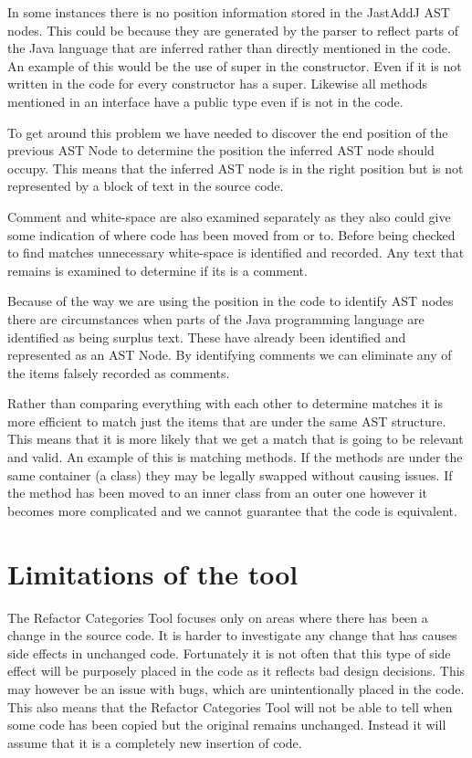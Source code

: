 In some instances there is no position information stored in the JastAddJ AST nodes.  This could be because they are generated by the parser to reflect parts of the Java language that are inferred rather than directly mentioned in the code.  An example of this would be the use of super in the constructor.  Even if it is not written in the code for every constructor has a super. Likewise all methods mentioned in an interface have a public type even if is not in the code.

To get around this problem we have needed to discover the end position of the previous AST Node to determine the position the inferred AST node should occupy.  This means that the inferred AST node is in the right position but is not represented by a block of text in the source code. 

Comment and white-space are also examined separately as they also could give some indication of where code has been moved from or to.
Before being checked to find matches unnecessary white-space is identified and recorded.
Any text that remains is examined to determine if its is a comment. 

Because of the way we are using the position in the code to identify AST nodes there are circumstances when parts of the Java programming language are identified as being surplus text. These have already been identified and represented as an AST Node. By identifying comments we can eliminate any of the items falsely recorded as comments.


% 
% 

Rather than comparing everything with each other to determine matches it is more efficient to match just the items that are under the same AST structure.  This means that it is more likely that we get a match that is going to be relevant and valid.  An example of this is matching methods. If the methods are under the same container (a class) they may be legally swapped without causing issues.  If the method has been moved to an inner class from an outer one however it becomes more complicated and we cannot guarantee that the code is equivalent.  


\section{Limitations of the tool}
The Refactor Categories Tool focuses only on areas where there has been a change in the source code. 
It is harder to investigate any change that has causes side effects in unchanged code.  Fortunately it is not often that this type of side effect will be purposely placed in the code as it reflects bad design decisions.  This may however be an issue with bugs, which are unintentionally placed in the code.  
This also means that the Refactor Categories Tool will not be able to tell when some code has been copied but the original remains unchanged. Instead it will assume that it is a completely new insertion of code.

